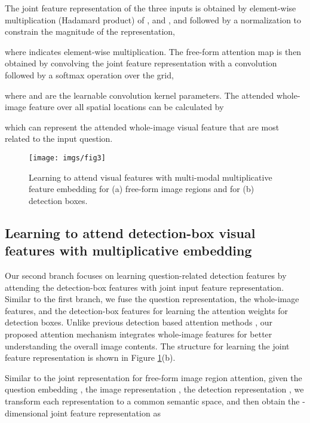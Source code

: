 \documentclass[letterpaper]{article}
\begin{document}
{The joint feature representation  of the three inputs is obtained by element-wise multiplication (Hadamard product) of ,  and , and followed by a  normalization to constrain the magnitude of the representation,

where  indicates element-wise multiplication. The free-form attention map is then obtained by convolving the joint feature representation  with a  convolution followed by a softmax operation over the  grid,

where  and  are the learnable convolution kernel parameters. The attended whole-image feature over all spatial locations can be calculated by

which can represent the attended whole-image visual feature that are most related to the input question.



\begin{figure}[th!]
	\centering
	\texttt{[image: imgs/fig3]}
	\caption{Learning to attend visual features with multi-modal multiplicative feature embedding for (a) free-form image regions and for (b) detection boxes.}
	\label{fig:mmf}
\end{figure}







\subsection{Learning to attend detection-box visual features with multiplicative embedding}\label{33}

Our second branch focuses on learning question-related detection features by attending the detection-box features with joint input feature representation. Similar to the first branch, we fuse the question representation, the whole-image features, and the detection-box features for learning the attention weights for detection boxes. Unlike previous detection based attention methods \cite{shih2016look,li2016visual}, our proposed attention mechanism integrates whole-image features for better understanding the overall image contents. The structure for learning the joint feature representation is shown in Figure \ref{fig:mmf}(b).


Similar to the joint representation for free-form image region attention, given the question embedding , the image representation , the detection representation , we transform each representation to a common semantic space, and then obtain the -dimensional joint feature representation  as 

}
\end{document}
